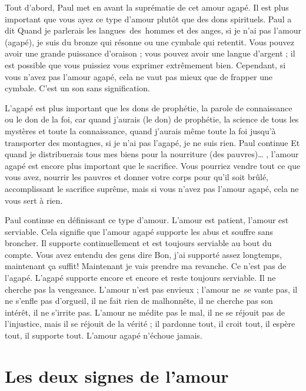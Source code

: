 Tout d'abord, Paul met en avant la suprématie de cet amour agapé.
 Il est plus important que vous ayez ce type d'amour
 plutôt que des dons spirituels. Paul a dit\frcolon{}
 \Og Quand je parlerais les langues~des~hommes et des anges,
 si je n'ai pas l'amour (agapé), je suis du bronze qui résonne
 ou une cymbale qui retentit. \Fg{}
 Vous pouvez avoir une grande puissance d'oraison ;
 vous pouvez avoir une langue d'argent ;
 il est possible que vous puissiez vous exprimer extrêmement bien.
 Cependant, si vous n'avez pas l'amour agapé, cela ne vaut pas mieux
 que de frapper une cymbale. C'est un son sans signification.

L'agapé est plus important que les dons de prophétie,
 la parole de connaissance ou le don de la foi,
 car \Og quand j'aurais (le don) de prophétie,
 la science de tous les mystères et toute la connaissance,
 quand j'aurais même toute la foi jusqu'à transporter des montagnes,
 si je n'ai pas l'agapé, je ne suis rien. \Fg{} Paul continue\frcolon{}
 \Og Et quand je distribuerais tous mes biens
 pour la nourriture (des pauvres)\dots{} \Fg{},
 l'amour agapé est encore plus important que le sacrifice.
 Vous pourriez vendre tout ce que vous avez, nourrir les pauvres
 et donner votre corps pour qu'il soit brûlé, accomplissant le sacrifice
 suprême, mais si vous n'avez pas l'amour agapé,
 cela ne vous sert à rien.
 \nowidow[6]
 

Paul continue en définissant ce type d'amour.
 \Og L'amour est patient, l'amour est serviable. \Fg{}
 Cela signifie que l'amour agapé supporte les abus et souffre sans broncher.
 Il supporte continuellement et est toujours serviable au bout du compte.
 Vous avez entendu des gens dire\frcolon{}
 \Og Bon, j'ai supporté assez longtemps, maintenant ça suffit!
 Maintenant je vais prendre ma revanche. \Fg{}
 Ce n'est pas de l'agapé. L'agapé supporte encore et encore
 et reste toujours serviable. Il ne cherche pas la vengeance.
 \Og L'amour n'est pas envieux ; l'amour ne~se vante pas,
 il ne s'enfle pas d'orgueil, il ne fait rien de malhonnête,
 il ne cherche pas son intérêt, il ne s'irrite pas.
 L'amour ne médite pas le mal, il ne se réjouit pas de l'injustice,
 mais il se réjouit de la vérité ; il pardonne tout, il croit tout,
 il espère tout, il supporte tout. \Fg{}
 L'amour agapé \Og n'échoue jamais. \Fg{}


\section{Les deux signes de l'amour}

